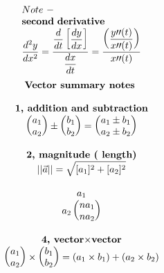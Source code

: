 \documentclass{article}
\begin{document}
\begin{multicols}{2}
\[\begin{array}{>{\displaystyle}l}
        \\
        Note\ -\ \\
        \mathbf{second\ derivative}\\
        \frac{d^{2} y}{dx^{2}} =\frac{\displaystyle \frac{d}{dt}\left[\displaystyle \frac{dy}{dx}\right]}{\displaystyle \frac{dx}{dt}} =\displaystyle  \frac{\left(\displaystyle \frac{y\prime \prime ( t)}{x\prime \prime ( t)}\right)}{x\prime \prime ( t)}    
    \end{array}
    \]
    \columnbreak
    \noindent 
    \[
    \begin{array}{>{\displaystyle}c}
        \textbf{Vector\ summary\ notes\ }\\
        \\
        \textbf{1, addition\ and\ subtraction}\\
        \begin{pmatrix}
        a_{1}\\
        a_{2}
        \end{pmatrix} \pm \begin{pmatrix}
        b_{1}\\
        b_{2}
        \end{pmatrix} =\begin{pmatrix}
        a_{1} \pm b_{1}\\
        a_{2} \pm b_{2}
        \end{pmatrix}\\
        \\
        \textbf{2, magnitude\ ( length)}\\
        ||\vec{a} ||=\sqrt{[ a_{1}]^{2} +[ a_{2}]^{2}}\\
        \\
        a_{1}\\
        a_{2}
        \begin{pmatrix}
        na_{1}\\
        na_{2}
        \end{pmatrix}\\
        \\
        \textbf{4, vector$\times$vector}\\
        \begin{pmatrix}
        a_{1}\\
        a_{2}
        \end{pmatrix} \times \begin{pmatrix}
        b_{1}\\
        b_{2}
        \end{pmatrix} =( a_{1} \times b_{1}) +( a_{2} \times b_{2})\\

\end{array}\]
\end{multicols}
\end{document}
